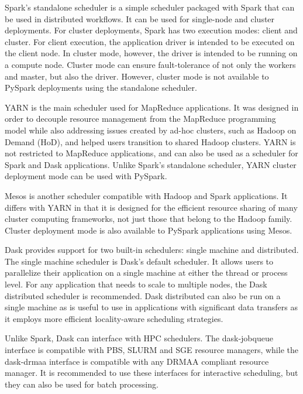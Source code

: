 \documentclass{report}
\begin{document}
            Spark's standalone scheduler is a simple scheduler packaged with 
            Spark that can be used in distributed workflows. It can be used
            for single-node and cluster deployments. For cluster deployments,
            Spark has two execution modes: client and cluster. For client 
            execution, the application driver is intended to be executed on the
            client node. In cluster mode, however, the driver is intended to be
            running on a compute node. Cluster mode can ensure fault-tolerance 
            of not only the workers and master, but also the driver. However,
            cluster mode is not available to PySpark deployments using the 
            standalone scheduler.

            YARN is the main scheduler used for MapReduce applications. It was 
            designed in order to decouple resource management from the 
            MapReduce programming model while also addressing issues created 
            by ad-hoc clusters, such as Hadoop on Demand (HoD), and helped 
            users transition to shared Hadoop clusters. YARN is not restricted 
            to MapReduce applications, and can also be used as a scheduler for 
            Spark and Dask applications. Unlike Spark's standalone scheduler, 
            YARN cluster deployment mode can be used with PySpark.
            
            Mesos is another scheduler compatible with Hadoop and Spark 
            applications. It differs with YARN in that it is designed for the
            efficient resource sharing of many cluster computing frameworks,
            not just those that belong to the Hadoop family. Cluster deployment
            mode is also available to PySpark applications using Mesos. 
            
            Dask provides support for two built-in schedulers: single machine
            and distributed. The single machine scheduler is Dask's default
            scheduler. It allows users to parallelize their application on a
            single machine at either the thread or process level. For any 
            application that needs to scale to multiple nodes, the Dask 
            distributed scheduler is recommended. Dask distributed can also be
            run on a single machine as is useful to use in applications with 
            significant data transfers as it employs more efficient 
            locality-aware scheduling strategies. 

            Unlike Spark, Dask can interface with HPC schedulers. The 
            dask-jobqueue interface is compatible with PBS, SLURM and SGE 
            resource managers, while the dask-drmaa interface is compatible 
            with any DRMAA compliant resource manager. It is recommended to use
            these interfaces for interactive scheduling, but they can also be
            used for batch processing.
\end{document}
